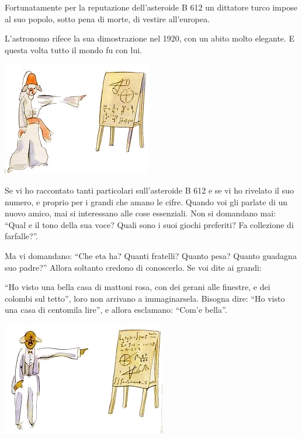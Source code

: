 \documentclass[11pt]{scrbook}
\begin{document}
Fortunatamente per la reputazione dell'asteroide B 612 un dittatore
turco impose al suo popolo, sotto pena di morte, di vestire all'europea.

L'astronomo rifece la sua dimostrazione nel 1920, con un abito molto
elegante. E questa volta tutto il mondo fu con lui.

\begin{center}
\includegraphics{img/4c}

\end{center}

Se vi ho raccontato tanti particolari sull'asteroide B 612 e se vi ho
rivelato il suo numero, e proprio per i grandi che amano le cifre.
Quando voi gli parlate di un nuovo amico, mai si interessano alle cose
essenziali. Non si domandano mai: ``Qual e il tono della sua voce? Quali
sono i suoi giochi preferiti? Fa collezione di farfalle?''.

Ma vi domandano: ``Che eta ha? Quanti fratelli? Quanto pesa? Quanto
guadagna suo padre?'' Allora soltanto credono di conoscerlo. Se voi dite
ai grandi:

``Ho visto una bella casa di mattoni rosa, con dei gerani alle finestre,
e dei colombi sul tetto'', loro non arrivano a immaginarsela. Bisogna
dire: ``Ho visto una casa di centomila lire'', e allora esclamano:
``Com'e bella''.

\begin{center}
\includegraphics{img/4d}

\end{center}
\end{document}
